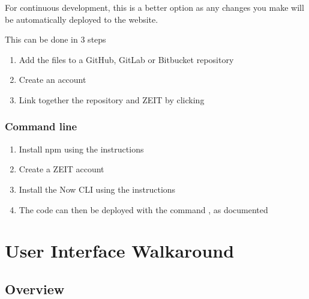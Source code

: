\documentclass[letterpaper,10pt,english]{sphinxmanual}
\let\oldsubsection\subsection
\renewcommand{\subsection}{\needspace{6\baselineskip}\oldsubsection}
\begin{document}
For continuous development, this is a better option as any changes you
make will be automatically deployed to the website.

This can be done in 3 steps
\begin{enumerate}
%
\item {} 
Add the files to a GitHub, GitLab or Bitbucket repository

\item {} 
Create an account 

\item {} 
Link together the repository and ZEIT by clicking 

\end{enumerate}


\subsection{Command line}
\label{\detokenize{docs/Installation/frontEnd:command-line}}\begin{enumerate}
%
\item {} 
Install npm using the instructions

\item {} 
Create a ZEIT account 

\item {} 
Install the Now CLI using the instructions

\item {} 
The code can then be deployed with the command , as documented

\end{enumerate}


\chapter{User Interface Walkaround}
\label{\detokenize{index:user-interface-walkaround}}

\section{Overview}
\label{\detokenize{docs/ui/overview:overview}}\label{\detokenize{docs/ui/overview::doc}}
\end{document}
